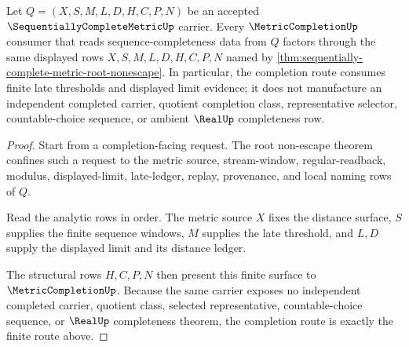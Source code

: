 \begin{theorem}
\label{thm:sequentially-complete-metric-completion-route}
Let $Q=(X,S,M,L,D,H,C,P,N)$ be an accepted $\SequentiallyCompleteMetricUp$ carrier. Every $\MetricCompletionUp$ consumer that reads sequence-completeness data from $Q$ factors through the same displayed rows $X,S,M,L,D,H,C,P,N$ named by \autoref{thm:sequentially-complete-metric-root-nonescape}. In particular, the completion route consumes finite late thresholds and displayed limit evidence; it does not manufacture an independent completed carrier, quotient completion class, representative selector, countable-choice sequence, or ambient $\RealUp$ completeness row.
\end{theorem}
\begin{proof}
Start from a completion-facing request. The root non-escape theorem confines such a request to the metric source, stream-window, regular-readback, modulus, displayed-limit, late-ledger, replay, provenance, and local naming rows of $Q$.

Read the analytic rows in order. The metric source $X$ fixes the distance surface, $S$ supplies the finite sequence windows, $M$ supplies the late threshold, and $L,D$ supply the displayed limit and its distance ledger.

The structural rows $H,C,P,N$ then present this finite surface to $\MetricCompletionUp$. Because the same carrier exposes no independent completed carrier, quotient class, selected representative, countable-choice sequence, or $\RealUp$ completeness theorem, the completion route is exactly the finite route above.
\end{proof}

